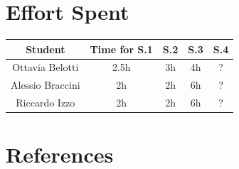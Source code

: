 \documentclass[table, 12pt]{article}
\begin{document}
\section{Effort Spent}
    \begin{tabular}{| c || c | c| c| c |}
        \hline
        Student & Time for S.1 & S.2 & S.3 & S.4 \\ \hline
        Ottavia Belotti & 2.5h & 3h & 4h & ? \\
        Alessio Braccini & 2h & 2h & 6h & ? \\
        Riccardo Izzo & 2h & 2h & 6h & ? \\
        \hline
    \end{tabular}

\section{References}
\end{document}
